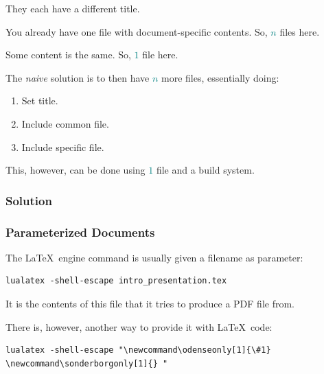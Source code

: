{\begin{frame}[fragile]
  \vspace{5mm}
  They each have a different title.
  
  \vspace{5mm}
  You already have one file with document-specific contents. So, \textcolor{teal}{$n$} files here.
  
  \vspace{5mm}
  Some content is the same. So, \textcolor{teal}{$1$} file here.
  
  \vspace{5mm}
  The \textsl{naive} solution is to then have \textcolor{teal}{$n$} more files, essentially doing:
  \begin{enumerate}
    \item Set title.
    \item Include common file.
    \item Include specific file.
  \end{enumerate}
  
  \vspace{3mm}
  This, however, can be done using \textcolor{teal}{$1$} file and a build system.
\end{frame}

\subsubsection{Solution}
\begin{frame}[fragile]
  \frametitle{Parameterized Documents }
  \vspace{3mm}
  The \LaTeX\ engine command is usually given a filename as parameter:
  
  \vspace{1mm}
  \begin{verbatim}
lualatex -shell-escape intro_presentation.tex
  \end{verbatim}
  
  \vspace{5mm}
  It is the contents of this file that it tries to produce a PDF file from.
  
  \pause
  \vspace{5mm}
  There is, however, another way to provide it with \LaTeX\ code:
  
  \vspace{1mm}
  \begin{verbatim}
lualatex -shell-escape "\newcommand\odenseonly[1]{\#1} \newcommand\sonderborgonly[1]{} "
  \end{verbatim}
  

\end{frame}}
